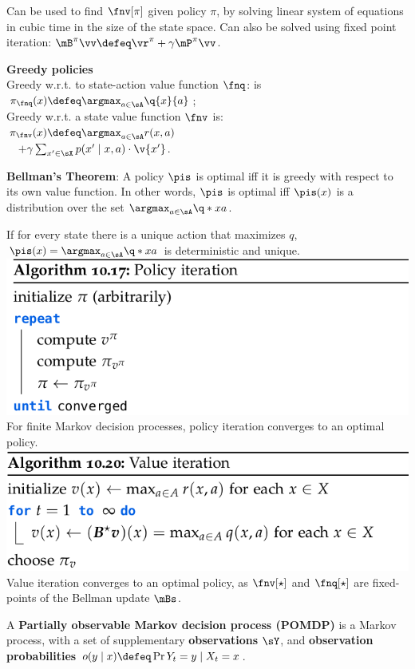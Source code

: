 Can be used to find $\fnv[\pi]$ given policy $\pi$, by solving linear system of equations in cubic time in the size of the state space. Can also be solved using fixed point iteration: $\mB^\pi \vv \defeq \vr^\pi + \gamma \mP^\pi \vv$.
\begin{framed}
    \textbf{Greedy policies} \\
    Greedy w.r.t. to state-action value function $\fnq$: is $\pi_{\fnq}(x) \defeq \argmax_{a \in \sA} \q{x}{a}$;\\
    Greedy w.r.t. a state value function $\fnv$ is: \\
    $\pi_{\fnv}(x) \defeq \argmax_{a \in \sA} r(x, a)$ \\
    $ \quad+ \gamma \sum_{x' \in \sX} p(x' \mid x, a) \cdot \v{x'}$.
    \vspace{2mm}
\end{framed}
\begin{framed}
    \textbf{Bellman's Theorem}: A policy $\pis$ is optimal iff it is greedy with respect to its own value function. In other words, $\pis$ is optimal iff $\pis(x)$ is a distribution over the set $\argmax_{a \in \sA} \q*{x}{a}$.
\end{framed}
If for every state there is a unique action that maximizes $q$, $\pis(x) = \argmax_{a \in \sA} \q*{x}{a}$ is deterministic and unique.
\includegraphics[width=0.9\linewidth]{images/Policy_Iteration.png}
For finite Markov decision processes, policy iteration converges to an optimal policy.
\includegraphics[width=0.9\linewidth]{images/Value_Iteration.png}
Value iteration converges to an optimal policy, as $\fnv[\star]$ and $\fnq[\star]$ are fixed-points of the Bellman update $\mBs$.
\begin{framed}
    A \textbf{Partially observable Markov decision process (POMDP)} is a Markov process, with a set of supplementary \textbf{observations} $\sY$, and \textbf{observation probabilities} $o(y \mid x) \defeq \Pr{Y_t = y \mid X_t = x}$.
\end{framed}
